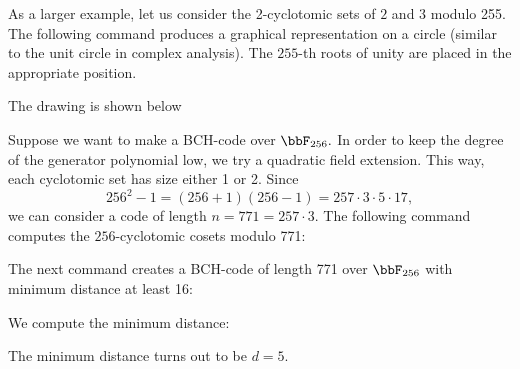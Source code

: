 \bigskip



As a larger example, let us consider the 2-cyclotomic sets of $2$ and $3$ modulo 255. 
The following command produces 
a graphical representation on a circle 
(similar to the unit circle in complex analysis). 
The $255$-th roots of unity are placed in the appropriate position.


The drawing is shown below 


\bigskip

Suppose we want to make a BCH-code over $\bbF_{256}.$
In order to keep the degree of the generator polynomial low, 
we try a quadratic field extension. 
This way, each cyclotomic set has size either 1 or 2.
Since 
$$
256^2-1 = (256+1)(256-1) = 257 \cdot 3 \cdot 5 \cdot 17,
$$
we can consider a code of length $n=771=257\cdot 3.$ 
The following command computes the $256$-cyclotomic cosets modulo 771:


The next command creates a BCH-code of length 771 
over $\bbF_{256}$ with minimum distance at least 16:



\bigskip

We compute the minimum distance:


The minimum distance turns out to be $d=5$.



\bigskip

